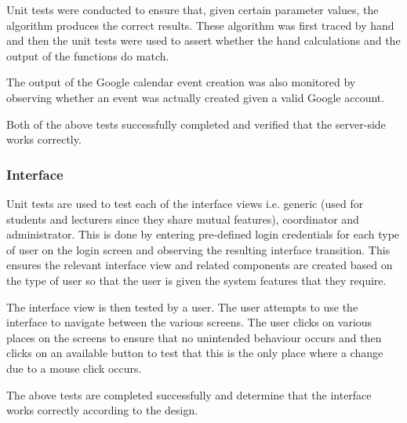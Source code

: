 Unit tests were conducted to ensure that, given certain parameter values, the algorithm produces the correct results. These algorithm was first traced by hand and then the unit tests were used to assert whether the hand calculations and the output of the functions do match.

The output of the Google calendar event creation was also monitored by observing whether an event was actually created given a valid Google account.

Both of the above tests successfully completed and verified that the server-side works correctly.

\subsubsection{Interface}

Unit tests are used to test each of the interface views i.e. generic (used for students and lecturers since they share mutual features), coordinator and administrator. This is done by entering pre-defined login credentials for each type of user on the login screen and observing the resulting interface transition. This ensures the relevant interface view and related components are created based on the type of user so that the user is given the system features that they require.

The interface view is then tested by a user. The user attempts to use the interface to navigate between the various screens. The user clicks on various places on the screens to ensure that no unintended behaviour occurs and then clicks on an available button to test that this is the only place where a change due to a mouse click occurs.

The above tests are completed successfully and determine that the interface works correctly according to the design.
